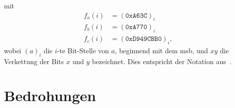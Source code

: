 %
mit
%
\begin{align*}
    f_{a}(i) & = {(\mathtt{0xA63C})}_{i}         \\
    f_{b}(i) & = {(\mathtt{0xA770})}_{i}         \\
    f_{c}(i) & = {(\mathtt{0xD949CBB0})}_{i} {,}
\end{align*}
%
wobei \({(a)}_{i}\) die \(i\)-te Bit-Stelle von \(a\), beginnend mit dem \gls{msb}, und \(x y\) die Verkettung der Bits \(x\) und \(y\) bezeichnet. Dies entspricht der Notation aus~\cite{Garcia2016,Verdult2015}.

\section{Bedrohungen}
